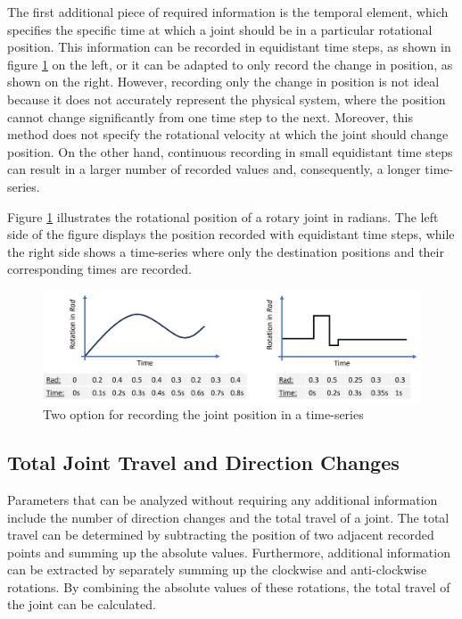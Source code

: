 The first additional piece of required information is the temporal element, which specifies the specific time at which a joint should be in a particular rotational position. This information can be recorded in equidistant time steps, as shown in figure \ref{equi} on the left, or it can be adapted to only record the change in position, as shown on the right. However, recording only the change in position is not ideal because it does not accurately represent the physical system, where the position cannot change significantly from one time step to the next. Moreover, this method does not specify the rotational velocity at which the joint should change position. On the other hand, continuous recording in small equidistant time steps can result in a larger number of recorded values and, consequently, a longer time-series.

Figure \ref{equi} illustrates the rotational position of a rotary joint in radians. The left side of the figure displays the position recorded with equidistant time steps, while the right side shows a time-series where only the destination positions and their corresponding times are recorded.


\begin{figure}[H]
	\centerline{\includegraphics[width=1\textwidth]{figures/equionchange.png}}
	\caption{Two option for recording the joint position in a time-series}
	\label{equi}
\end{figure}


\subsection{Total Joint Travel and Direction Changes}
Parameters that can be analyzed without requiring any additional information include the number of direction changes and the total travel of a joint. The total travel can be determined by subtracting the position of two adjacent recorded points and summing up the absolute values. Furthermore, additional information can be extracted by separately summing up the clockwise and anti-clockwise rotations. By combining the absolute values of these rotations, the total travel of the joint can be calculated.

